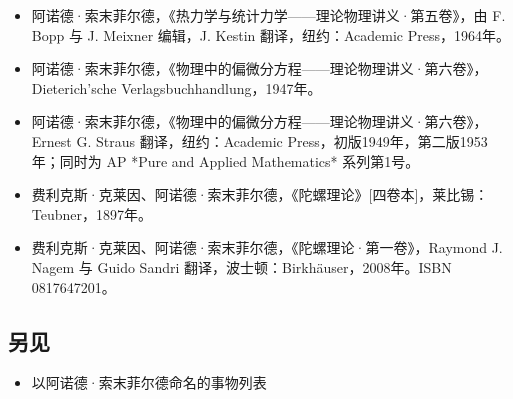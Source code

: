\begin{itemize}
\item 阿诺德·索末菲尔德，《热力学与统计力学——理论物理讲义·第五卷》，由 F. Bopp 与 J. Meixner 编辑，J. Kestin 翻译，纽约：Academic Press，1964年。
\item 阿诺德·索末菲尔德，《物理中的偏微分方程——理论物理讲义·第六卷》，Dieterich’sche Verlagsbuchhandlung，1947年。
\item 阿诺德·索末菲尔德，《物理中的偏微分方程——理论物理讲义·第六卷》，Ernest G. Straus 翻译，纽约：Academic Press，初版1949年，第二版1953年；同时为 AP *Pure and Applied Mathematics* 系列第1号。
\item 费利克斯·克莱因、阿诺德·索末菲尔德，《陀螺理论》[四卷本]，莱比锡：Teubner，1897年。
\item 费利克斯·克莱因、阿诺德·索末菲尔德，《陀螺理论·第一卷》，Raymond J. Nagem 与 Guido Sandri 翻译，波士顿：Birkhäuser，2008年。ISBN 0817647201。
\end{itemize}
\subsection{另见}
\begin{itemize}
\item 以阿诺德·索末菲尔德命名的事物列表
\end{itemize}
